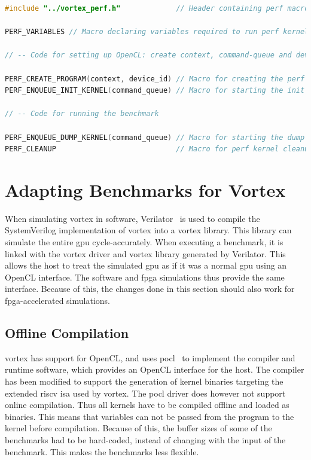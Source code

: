 \begin{lstlisting}[language=C, caption=Example of using the perf macros to create and use the initialization and dump kernels, label={lst:macros}]
#include "../vortex_perf.h"             // Header containing perf macros

PERF_VARIABLES // Macro declaring variables required to run perf kernels

// -- Code for setting up OpenCL: create context, command-queue and device

PERF_CREATE_PROGRAM(context, device_id) // Macro for creating the perf kernels
PERF_ENQUEUE_INIT_KERNEL(command_queue) // Macro for starting the init kernel

// -- Code for running the benchmark

PERF_ENQUEUE_DUMP_KERNEL(command_queue) // Macro for starting the dump kernel
PERF_CLEANUP                            // Macro for perf kernel cleanup 
\end{lstlisting}

\section{Adapting Benchmarks for Vortex}

When simulating \Gls{vortex} in software, Verilator~\cite{verilator} is used to compile the SystemVerilog implementation of \Gls{vortex} into a vortex library. This library can simulate the entire \acrshort{gpu} cycle-accurately. When executing a benchmark, it is linked with the \Gls{vortex} driver and \Gls{vortex} library generated by Verilator. This allows the host to treat the simulated \acrshort{gpu} as if it was a normal \acrshort{gpu} using an OpenCL interface. The software and \acrshort{fpga} simulations thus provide the same interface. Because of this, the changes done in this section should also work for \acrshort{fpga}-accelerated simulations.

\newpage
\subsection{Offline Compilation} \label{sec:offline_comp}

\Gls{vortex} has support for OpenCL, and uses \gls{pocl}~\cite{pocl} to implement the compiler and runtime software, which provides an OpenCL interface for the host. The compiler has been modified to support the generation of kernel binaries targeting the extended \Gls{riscv} \acrshort{isa} used by \Gls{vortex}. The \gls{pocl} driver does however not support online compilation. Thus all kernels have to be compiled offline and loaded as binaries. This means that variables can not be passed from the program to the kernel before compilation. Because of this, the buffer sizes of some of the benchmarks had to be hard-coded, instead of changing with the input of the benchmark. This makes the benchmarks less flexible.

